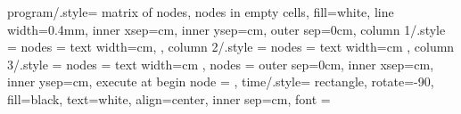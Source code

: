 \documentclass{article}
\begin{document}
\sloppy
\pagestyle{empty}
\setlength{\parindent}{0cm} %
\frenchspacing

\small
\tikzset
{
    program/.style=
    {
        matrix of nodes,
        nodes in empty cells,
        fill=white,
        line width=0.4mm,
        inner xsep=cm,
        inner ysep=cm,
        outer sep=0cm,
        column 1/.style =
        {
            nodes =
            {
                text width=cm,
            }
        },
        column 2/.style =
        {
            nodes =
            {
                text width=cm
            }
        },
        column 3/.style =
        {
            nodes =
            {
                text width=cm
            }
        },
        nodes =
        {
            outer sep=0cm,
            inner xsep=cm,
            inner ysep=cm,
            execute at begin node = 
        }
    },
    time/.style=
    {
        rectangle,
        rotate=-90,
        fill=black,
        text=white,
        align=center,
        inner sep=cm,
        font = \Large
    }
}

\end{document}
